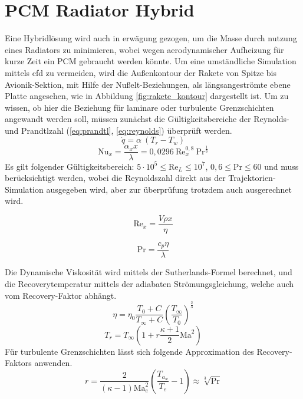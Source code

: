 \section{PCM Radiator Hybrid}
\label{sec:pcmRadiatorHybrid}
Eine Hybridlösung wird auch in erwägung gezogen, um die Masse durch nutzung eines Radiators zu minimieren, wobei wegen aerodynamischer Aufheizung für kurze Zeit ein PCM gebraucht werden könnte.
Um eine umständliche Simulation mittels \ac{cfd} zu vermeiden, wird die Außenkontour der Rakete von Spitze bis Avionik-Sektion, mit Hilfe der Nußelt-Beziehungen, als längsangeströmte ebene Platte angesehen,
wie in Abbildung \ref{fig:rakete_kontour} dargestellt ist.
Um zu wissen, ob hier die Beziehung für laminare oder turbulente Grenzschichten angewandt werden soll, müssen zunächst die Gültigkeitsbereiche der Reynolds- und Prandtlzahl (\ref{eq:prandtl}, \ref{eq:reynolds}) überprüft werden.
\begin{equation}
  \label{eq:qdot}
  \dot{q} = \alpha \ (T_r - T_w)
\end{equation}
\begin{equation}
  \label{eq:nusselt_turbulent}
  \text{Nu}_x = \frac{\alpha_x x}{\lambda} = 0,0296 \ \text{Re}_x^{0,8} \ \text{Pr}^{\frac{1}{3}}
\end{equation}
Es gilt folgender Gültigkeitsbereich: $5 \cdot 10^5 \leq \text{Re}_L \leq 10^7$, $0,6 \leq \text{Pr} \leq 60$ und muss berücksichtigt werden,
wobei die Reynoldszahl direkt aus der Trajektorien-Simulation ausgegeben wird, aber zur überprüfung trotzdem auch ausgerechnet wird.
\newline
\noindent\begin{minipage}{.5\linewidth}
\begin{equation}
  \label{eq:reynolds}
  \text{Re}_x = \frac{V \rho x}{\eta}
\end{equation}
\end{minipage}%
\begin{minipage}{.5\linewidth}
\begin{equation}
  \label{eq:prandtl}
  \text{Pr} = \frac{c_p \eta}{\lambda}
\end{equation}
\end{minipage}
Die Dynamische Viskosität wird mittels der Sutherlands-Formel berechnet, und die Recoverytemperatur mittels der adiabaten Strömungsgleichung, welche auch vom Recovery-Faktor abhängt.
\begin{equation}
  \label{eq:dynamische_viskositaet}
  \eta = \eta_0 \frac{T_0 + C}{T_{\infty} + C} \left( \frac{T_{\infty}}{T_0} \right)^{\frac{2}{3}}
\end{equation}
\begin{equation}
  \label{eq:recovery_temperatur}
  T_r = T_{\infty} \left( 1 + r \frac{\kappa + 1}{2} \text{Ma}^2 \right)
\end{equation}
Für turbulente Grenzschichten lässt sich folgende Approximation des Recovery-Faktors anwenden.
\begin{equation}
  \label{eq:recovery_faktor}
  r = \frac{2}{\left(\kappa - 1\right) \text{Ma}_e^2} \left(\frac{T_{a_{w}}}{T_e} - 1\right) \approx \sqrt[3]{\text{Pr}}
\end{equation}

